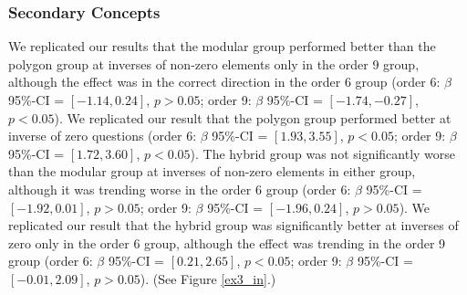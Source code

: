 \documentclass[11pt]{article}
\begin{document}
\subsubsection{Secondary Concepts}
We replicated our results that the modular group performed better than the polygon group at inverses of non-zero elements only in the order 9 group, although the effect was in the correct direction in the order 6 group (order 6: $\beta$ 95\%-CI = $[-1.14,0.24]$, $p > 0.05$; order 9: $\beta$ 95\%-CI = $[-1.74,-0.27]$, $p < 0.05$). We replicated our result that the polygon group performed better at inverse of zero questions (order 6: $\beta$ 95\%-CI = $[1.93,3.55]$, $p < 0.05$; order 9: $\beta$ 95\%-CI = $[1.72,3.60]$, $p < 0.05$). The hybrid group was not significantly worse than the modular group at inverses of non-zero elements in either group, although it was trending worse in the order 6 group (order 6: $\beta$ 95\%-CI = $[-1.92,0.01]$, $p > 0.05$; order 9: $\beta$ 95\%-CI = $[-1.96,0.24]$, $p > 0.05$). We replicated our result that the hybrid group was significantly better at inverses of zero only in the order 6 group, although the effect was trending in the order 9 group (order 6: $\beta$ 95\%-CI = $[0.21,2.65]$, $p < 0.05$; order 9: $\beta$ 95\%-CI = $[-0.01,2.09]$, $p > 0.05$). (See Figure \ref{ex3_in}.) \\[11pt]
\end{document}
